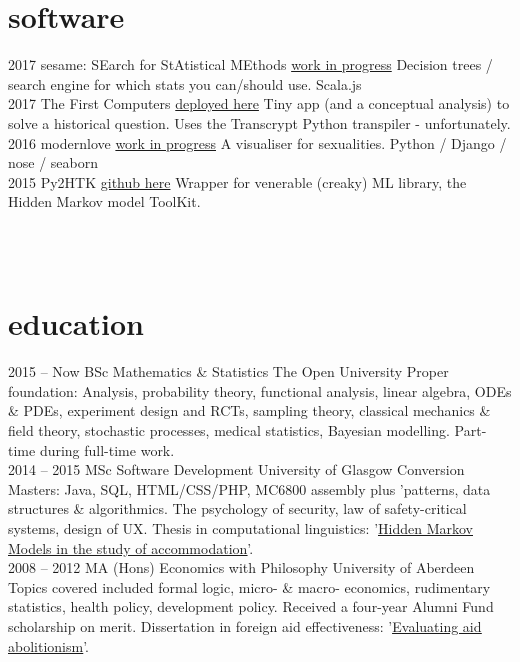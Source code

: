 \documentclass[]{friggeri-cv}
\newcommand{\altHmms}{\underline{\href{https://www.gleech.org/accommodation}{Hidden Markov Models in the study of accommodation}}}%
\newcommand{\altAid}{\underline{\href{https://www.gleech.org/aid}{Evaluating aid abolitionism}}}%
\newcommand{\sparkCert}{\underline{\href{http://www.oreilly.com/data/sparkcert.html}{O'Reilly Developer Certification for Spark}}}%
\newcommand{\scala}{\underline{\href{https://www.coursera.org/specializations/scala}{Odersky`s Scala Specialisation}}}%
\begin{document}
\section{software}
% 
\begin{entrylist}
  \entry
    {2017}
    {sesame: SEarch for StAtistical MEthods}
    {\href{}{work in progress}}
    {Decision trees / search engine for which stats you can/should use. Scala.js}
\\
  \entry
    {2017}
    {The First Computers}
    {\href{https://www.gleech.org/first-computers/}{deployed here}}
    {Tiny app (and a conceptual analysis) to solve a historical question. Uses the Transcrypt Python transpiler - unfortunately.}
\\
  \entry
     {2016}
     {modernlove}
     {\href{}{work in progress}}
     {A visualiser for sexualities. Python / Django / nose / seaborn }
\\
  \entry
    {2015}
    {Py2HTK}
    {\href{https://github.com/g-leech/Py2HTK}{github here}}
    {Wrapper for venerable (creaky) ML library, the Hidden Markov model ToolKit. }

\end{entrylist}
\\\\
\section{education}
\begin{entrylist}
  \entry
    {2015 – Now}
    {BSc Mathematics \& Statistics}
    {The Open University}
    {Proper foundation: Analysis, probability theory, functional analysis, linear algebra, ODEs \& PDEs, experiment design and RCTs, sampling theory, classical mechanics \& field theory, stochastic processes, medical statistics, Bayesian modelling. Part-time during full-time work.}\smallskip \\
    
  \entry
    {2014 – 2015}
    {MSc Software Development}
    {University of Glasgow}
    {Conversion Masters: Java, SQL, HTML/CSS/PHP, MC6800 assembly plus 'patterns, data structures \& algorithmics. The psychology of security, law of safety-critical systems, design of UX. Thesis in computational linguistics: '\altHmms{}'.} \smallskip\\
  \entry
    {2008 – 2012}
    {MA (Hons) Economics with Philosophy} 
    {University of Aberdeen}
    {Topics covered included formal logic, micro- \& macro- economics, rudimentary
statistics, health policy, development policy. Received a four-year Alumni Fund scholarship on merit. Dissertation in foreign aid effectiveness: '\altAid{}'.}
\end{entrylist}
\end{document}
